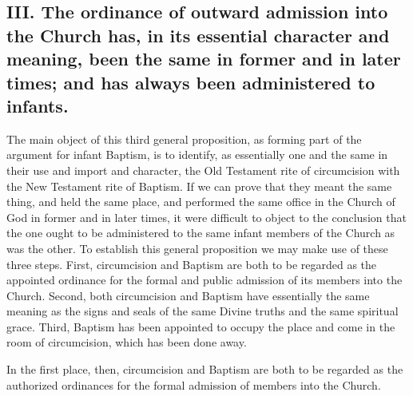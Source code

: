 \documentclass[]{book}
\begin{document}
\hypertarget{iii.-the-ordinance-of-outward-admission-into-the-church-has-in-its-essential-character-and-meaning-been-the-same-in-former-and-in-later-times-and-has-always-been-administered-to-infants.}{%
\subsection{III. The ordinance of outward admission into the Church has, in its essential character and meaning, been the same in former and in later times; and has always been administered to infants.}\label{iii.-the-ordinance-of-outward-admission-into-the-church-has-in-its-essential-character-and-meaning-been-the-same-in-former-and-in-later-times-and-has-always-been-administered-to-infants.}}

The main object of this third general proposition, as forming part of the argument for infant Baptism, is to identify, as essentially one and the same in their use and import and character, the Old Testament rite of circumcision with the New Testament rite of Baptism. If we can prove that they meant the same thing, and held the same place, and performed the same office in the Church of God in former and in later times, it were difficult to object to the conclusion that the one ought to be administered to the same infant members of the Church as was the other. To establish this general proposition we may make use of these three steps. First, circumcision and Baptism are both to be regarded as the appointed ordinance for the formal and public admission of its members into the Church. Second, both circumcision and Baptism have essentially the same meaning as the signs and seals of the same Divine truths and the same spiritual grace. Third, Baptism has been appointed to occupy the place and come in the room of circumcision, which has been done away.

In the first place, then, circumcision and Baptism are both to be regarded as the authorized ordinances for the formal admission of members into the Church.
\end{document}
